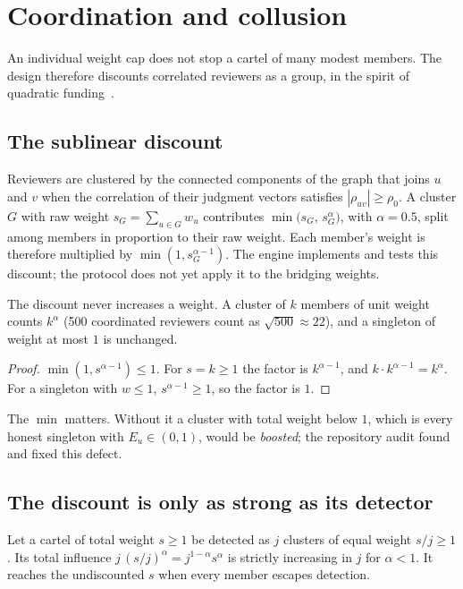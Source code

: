 \section{Coordination and collusion}\label{sec:collusion}

An individual weight cap does not stop a cartel of many modest members. The design therefore
discounts correlated reviewers as a group, in the spirit of quadratic funding~\cite{buterin2019flexible}.

\subsection{The sublinear discount}

Reviewers are clustered by the connected components of the graph that joins $u$ and $v$ when the
correlation of their judgment vectors satisfies $|\rho_{uv}|\ge\rho_0$. A cluster $G$ with raw
weight $s_G=\sum_{u\in G}w_u$ contributes $\min\bigl(s_G,\,s_G^{\alpha}\bigr)$, with $\alpha=0.5$,
split among members in proportion to their raw weight. Each member's weight is therefore
multiplied by $\min(1,s_G^{\alpha-1})$. The engine implements and tests this discount; the
protocol does not yet apply it to the bridging weights.

\begin{lemma}\label{lem:discount}\proved{}
The discount never increases a weight. A cluster of $k$ members of unit weight counts $k^{\alpha}$
(500 coordinated reviewers count as $\sqrt{500}\approx22$), and a singleton of weight at most $1$
is unchanged.
\end{lemma}
\begin{proof}
$\min(1,s^{\alpha-1})\le1$. For $s=k\ge1$ the factor is $k^{\alpha-1}$, and $k\cdot k^{\alpha-1}=k^\alpha$.
For a singleton with $w\le1$, $s^{\alpha-1}\ge1$, so the factor is $1$.
\end{proof}

The $\min$ matters. Without it a cluster with total weight below $1$, which is every honest
singleton with $E_u\in(0,1)$, would be \emph{boosted}; the repository audit found and fixed this
defect.

\subsection{The discount is only as strong as its detector}

\begin{proposition}\label{prop:split}\proved{}
Let a cartel of total weight $s\ge1$ be detected as $j$ clusters of equal weight $s/j\ge1$. Its
total influence $j\,(s/j)^{\alpha}=j^{1-\alpha}s^{\alpha}$ is strictly increasing in $j$ for
$\alpha<1$. It reaches the undiscounted $s$ when every member escapes detection.
\end{proposition}

